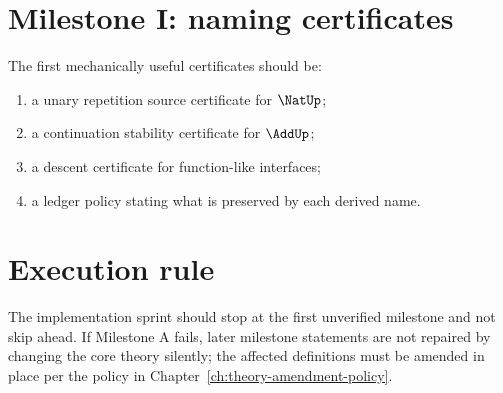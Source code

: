 \section{Milestone I: naming certificates}

The first mechanically useful certificates should be:
\begin{enumerate}
  \item a unary repetition source certificate for \(\NatUp\);
  \item a continuation stability certificate for \(\AddUp\);
  \item a descent certificate for function-like interfaces;
  \item a ledger policy stating what is preserved by each derived name.
\end{enumerate}

\section{Execution rule}

The implementation sprint should stop at the first unverified milestone and not skip ahead. If Milestone A fails, later milestone statements are not repaired by changing the core theory silently; the affected definitions must be amended in place per the policy in Chapter~\ref{ch:theory-amendment-policy}.
